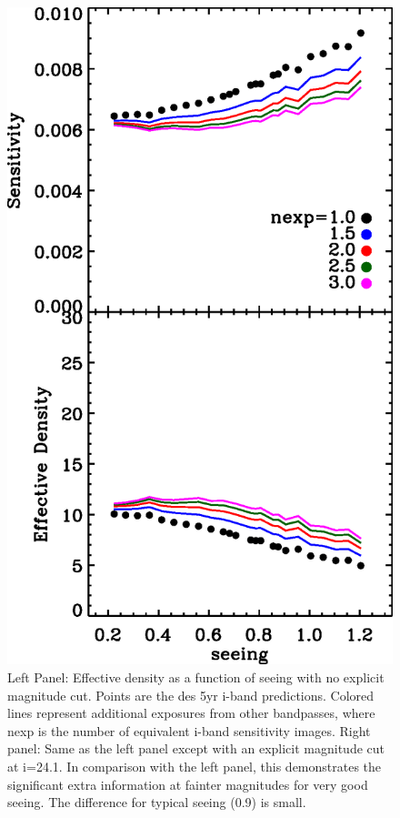 \documentclass[12pt,preprint]{aastex}
\newcommand{\magcut}{24.1}
\begin{document}
\begin{figure}[p]
    \includegraphics[scale=0.6]{plots/des5yr-convolved-maxmag24.1-neff-vs-seeing.eps}

    \caption{Left Panel: Effective density as a function of seeing with no
explicit magnitude cut.  Points are the des 5yr i-band predictions.  Colored
lines represent additional exposures from other bandpasses, where nexp is the
number of equivalent i-band sensitivity images.  Right panel: Same as the left
panel except with an explicit magnitude cut at i=\magcut. In comparison with
the left panel, this demonstrates the significant extra information at fainter
magnitudes for very good seeing.  The difference for typical seeing (0.9) is
small. \label{fig:neff-seeing} }

\end{figure}
\end{document}
